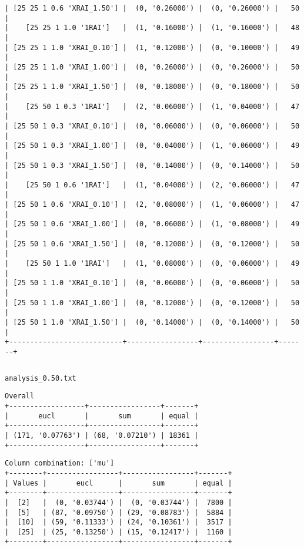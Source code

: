 \documentclass{article}
\begin{document}
\begin{verbatim}
| [25 25 1 0.6 'XRAI_1.50'] |  (0, '0.26000') |  (0, '0.26000') |   50  |
|    [25 25 1 1.0 '1RAI']   |  (1, '0.16000') |  (1, '0.16000') |   48  |
| [25 25 1 1.0 'XRAI_0.10'] |  (1, '0.12000') |  (0, '0.10000') |   49  |
| [25 25 1 1.0 'XRAI_1.00'] |  (0, '0.26000') |  (0, '0.26000') |   50  |
| [25 25 1 1.0 'XRAI_1.50'] |  (0, '0.18000') |  (0, '0.18000') |   50  |
|    [25 50 1 0.3 '1RAI']   |  (2, '0.06000') |  (1, '0.04000') |   47  |
| [25 50 1 0.3 'XRAI_0.10'] |  (0, '0.06000') |  (0, '0.06000') |   50  |
| [25 50 1 0.3 'XRAI_1.00'] |  (0, '0.04000') |  (1, '0.06000') |   49  |
| [25 50 1 0.3 'XRAI_1.50'] |  (0, '0.14000') |  (0, '0.14000') |   50  |
|    [25 50 1 0.6 '1RAI']   |  (1, '0.04000') |  (2, '0.06000') |   47  |
| [25 50 1 0.6 'XRAI_0.10'] |  (2, '0.08000') |  (1, '0.06000') |   47  |
| [25 50 1 0.6 'XRAI_1.00'] |  (0, '0.06000') |  (1, '0.08000') |   49  |
| [25 50 1 0.6 'XRAI_1.50'] |  (0, '0.12000') |  (0, '0.12000') |   50  |
|    [25 50 1 1.0 '1RAI']   |  (1, '0.08000') |  (0, '0.06000') |   49  |
| [25 50 1 1.0 'XRAI_0.10'] |  (0, '0.06000') |  (0, '0.06000') |   50  |
| [25 50 1 1.0 'XRAI_1.00'] |  (0, '0.12000') |  (0, '0.12000') |   50  |
| [25 50 1 1.0 'XRAI_1.50'] |  (0, '0.14000') |  (0, '0.14000') |   50  |
+---------------------------+-----------------+-----------------+-------+
\end{verbatim}

\begin{verbatim}

\end{verbatim}

\newpage
\verb|analysis_0.50.txt|
\begin{verbatim}
Overall
+------------------+-----------------+-------+
|       eucl       |       sum       | equal |
+------------------+-----------------+-------+
| (171, '0.07763') | (68, '0.07210') | 18361 |
+------------------+-----------------+-------+
\end{verbatim}

\begin{verbatim}
Column combination: ['mu']
+--------+-----------------+-----------------+-------+
| Values |       eucl      |       sum       | equal |
+--------+-----------------+-----------------+-------+
|  [2]   |  (0, '0.03744') |  (0, '0.03744') |  7800 |
|  [5]   | (87, '0.09750') | (29, '0.08783') |  5884 |
|  [10]  | (59, '0.11333') | (24, '0.10361') |  3517 |
|  [25]  | (25, '0.13250') | (15, '0.12417') |  1160 |
+--------+-----------------+-----------------+-------+
\end{verbatim}
\end{document}
